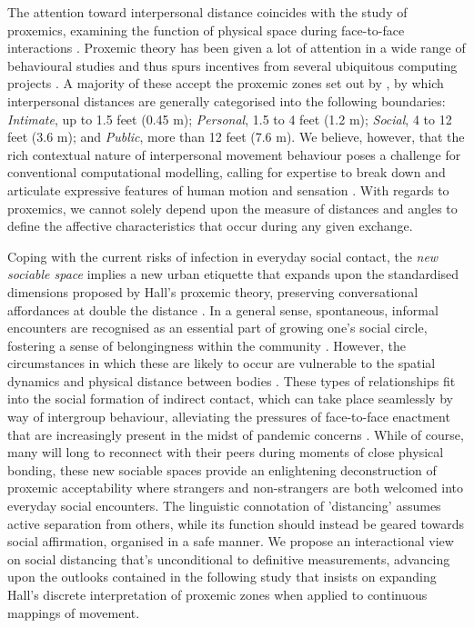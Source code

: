 The attention toward interpersonal distance coincides with the study of proxemics, examining the function of physical space during face-to-face interactions \citep{hall_hidden_1966, guerrero_proxemics_2015}. Proxemic theory has been given a lot of attention in a wide range of behavioural studies \citep{mccall_mapping_2017} and thus spurs incentives from several ubiquitous computing projects \citep{perez_mobile_2020, marquardt_proxemic_2015}. A majority of these accept the proxemic zones set out by \citeauthor{hall_hidden_1966} \cite{hall_hidden_1966}, by which interpersonal distances are generally categorised into the following boundaries: \textit{Intimate}, up to 1.5 feet (0.45 m); \textit{Personal}, 1.5 to 4 feet (1.2 m); \textit{Social}, 4 to 12 feet (3.6 m); and \textit{Public}, more than 12 feet (7.6 m). We believe, however, that the rich contextual nature of interpersonal movement behaviour poses a challenge for conventional computational modelling, calling for expertise to break down and articulate expressive features of human motion and sensation \citep{fdili_alaoui_how_2015,schiphorst_self-evidence_2011}. With regards to proxemics, we cannot solely depend upon the measure of distances and angles to define the affective characteristics that occur during any given exchange.

Coping with the current risks of infection in everyday social contact, the \textit{new sociable space} implies a new urban etiquette that expands upon the standardised dimensions proposed by Hall's proxemic theory, preserving conversational affordances at double the distance \citep{mehta_new_2020}. In a general sense, spontaneous, informal encounters are recognised as an essential part of growing one's social circle, fostering a sense of belongingness within the community \citep{ye_ambivalence_2016}. However, the circumstances in which these are likely to occur are vulnerable to the spatial dynamics and physical distance between bodies \citep{van_den_berg_subjective_2017, fayard_photocopiers_2007}. These types of relationships fit into the social formation of indirect contact, which can take place seamlessly by way of intergroup behaviour, alleviating the pressures of face-to-face enactment \citep{white_beyond_2021} that are increasingly present in the midst of pandemic concerns \citep{durnova_intimacy_2021}. While of course, many will long to reconnect with their peers during moments of close physical bonding, these new sociable spaces provide an enlightening deconstruction of proxemic acceptability where strangers and non-strangers are both welcomed into everyday social encounters. The linguistic connotation of 'distancing' assumes active separation from others, while its function should instead be geared towards social affirmation, organised in a safe manner. We propose an interactional view on social distancing that's unconditional to definitive measurements, advancing upon the outlooks contained in the following study \citep{ballendat_proxemic_2010} that insists on expanding Hall's discrete interpretation of proxemic zones when applied to continuous mappings of movement.

